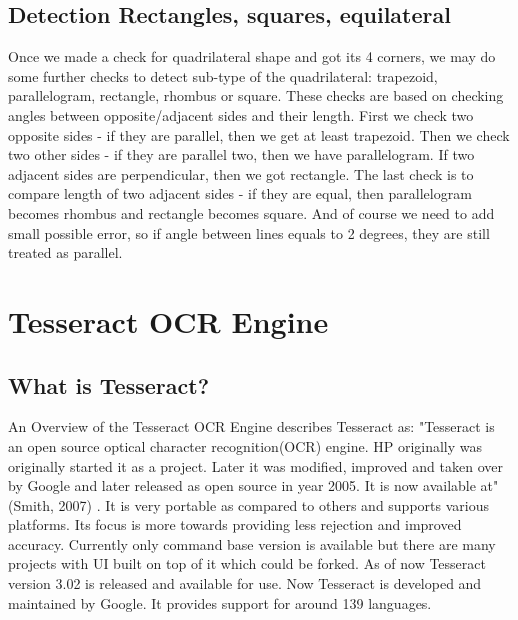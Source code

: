 \subsection{Detection Rectangles, squares, equilateral}
Once we made a check for quadrilateral shape and got its 4 corners, we may do some further checks to detect sub-type of the quadrilateral: trapezoid, parallelogram, rectangle, rhombus or square. These checks are based on checking angles between opposite/adjacent sides and their length. First we check two opposite sides - if they are parallel, then we get at least trapezoid. Then we check two other sides - if they are parallel two, then we have parallelogram. If two adjacent sides are perpendicular, then we got rectangle. The last check is to compare length of two adjacent sides - if they are equal, then parallelogram becomes rhombus and rectangle becomes square. And of course we need to add small possible error, so if angle between lines equals to 2 degrees, they are still treated as parallel.
\section{Tesseract OCR Engine}
\subsection{What is Tesseract?}
An Overview of the Tesseract OCR Engine describes Tesseract as: "Tesseract is an open source
optical character recognition(OCR) engine. HP originally was originally started it as a project. Later it was modified, improved and taken over by Google and later released as open source
in year 2005. It is now available at" (Smith, 2007) . It is very portable as compared to others
and supports various platforms. Its focus is more towards providing less rejection and improved
accuracy. Currently only command base version is available but there are many projects with UI
built on top of it which could be forked. As of now Tesseract version 3.02 is released and
available for use. Now Tesseract is developed and maintained by Google. It provides support for
around 139 languages.
